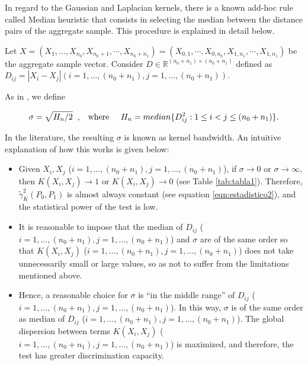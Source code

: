 \documentclass[11pt]{article}
\begin{document}
In regard to the Gaussian and Laplacian kernels, there is a known add-hoc rule called Median heuristic that consists in selecting the median between the distance pairs of the aggregate sample. This procedure is explained in detail below.

Let $X= (X_1,\dots,X_{n_0},X_{n_0+1},\cdots,X_{n_0+n_1})= (X_{0,1},\cdots,X_{0,n_0}, X_{1,n_1} ,\cdots, X_{1,n_1})$ be the aggregate sample vector. Consider $D  \in \mathbb{R}^{  (n_0+n_1) \times  (n_0+n_1) }$ defined as $D_{ij}=  |X_i-X_j| (i=1,\dots ,(n_0+n_1),j=1,\dots ,(n_0+n_1))$. 


As in \cite{garreau2017large},  we define

$$\sigma= \sqrt{H_{n}/2} \hspace{0.2cm},\,\,\,\,\, \text{where} \,\,\,\,\, \hspace{0.2cm} H_{n}= median\{D_{ij}^{2}:1\leq i<j\leq (n_0+n_1)\}. $$

In the literature, the resulting $\sigma$  is known  as kernel bandwidth.  An intuitive explanation of how this works is given below:

\begin{itemize}
	\item Given $X_i,X_j$ ($i=1,\dots ,(n_0+n_1),j=1,\dots ,(n_0+n_1)$), if $\sigma\to 0$ or $\sigma\to \infty$, then $K(X_i,X_j)\to1$ or $K(X_i,X_j)\to 0$  (see Table \ref{tab:tabla1}).  Therefore,  $\tilde{\gamma}_K^{2}(P_0,P_1)$ is almost always constant (see equation \ref{eqn:estadistico2}), and  the statistical power  of the test is  low.   
	\item It is reasonable to impose that the median of  $D_{ij}$ ($i=1,\dots ,(n_0+n_1),j=1,\dots ,(n_0+n_1)$) and $\sigma$  are of the same order so that $K(X_i,X_j)$ ($i=1,\dots ,(n_0+n_1),j=1,\dots ,(n_0+n_1)$) does not take   unnecessarily small or large values, so as not to suffer from the limitations mentioned above. 
	\item Hence, a reasonable choice for $\sigma$  is “in the middle range” of  $D_{ij}$ ($i=1,\dots ,(n_0+n_1),j=1,\dots ,(n_0+n_1)$). In this way, $\sigma$ is of the same order as median of $D_{ij}$ ($i=1,\dots ,(n_0+n_1),j=1,\dots ,(n_0+n_1)$). The global dispersion between terms $K(X_i,X_j)$ ($i=1,\dots ,(n_0+n_1),j=1,\dots ,(n_0+n_1)$) is maximized, and therefore, the test has greater discrimination capacity.
	
	
	
	
\end{itemize}
\end{document}
